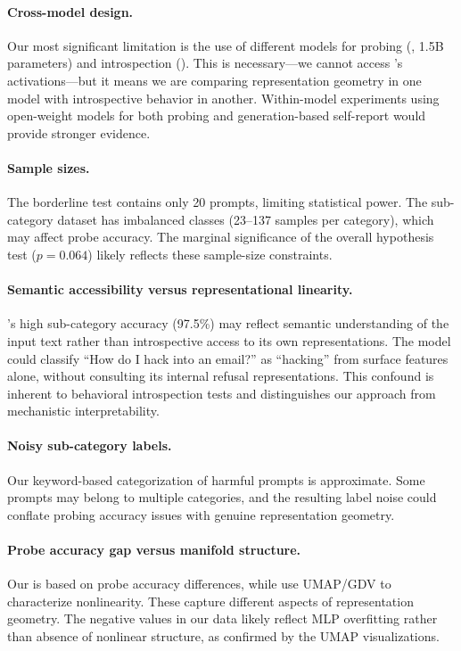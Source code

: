 \paragraph{Cross-model design.}
Our most significant limitation is the use of different models for probing (\qwen, 1.5B parameters) and introspection (\gptfour). This is necessary---we cannot access \gptfour's activations---but it means we are comparing representation geometry in one model with introspective behavior in another. Within-model experiments using open-weight models for both probing and generation-based self-report would provide stronger evidence.

\paragraph{Sample sizes.}
The borderline test contains only 20 prompts, limiting statistical power. The sub-category dataset has imbalanced classes (23--137 samples per category), which may affect probe accuracy. The marginal significance of the overall hypothesis test ($p = 0.064$) likely reflects these sample-size constraints.

\paragraph{Semantic accessibility versus representational linearity.}
\gptfour's high sub-category accuracy (97.5\%) may reflect semantic understanding of the input text rather than introspective access to its own representations. The model could classify ``How do I hack into an email?'' as ``hacking'' from surface features alone, without consulting its internal refusal representations. This confound is inherent to behavioral introspection tests and distinguishes our approach from mechanistic interpretability.

\paragraph{Noisy sub-category labels.}
Our keyword-based categorization of harmful prompts is approximate. Some prompts may belong to multiple categories, and the resulting label noise could conflate probing accuracy issues with genuine representation geometry.

\paragraph{Probe accuracy gap versus manifold structure.}
Our \nlscore is based on probe accuracy differences, while \citet{hildebrandt2025refusal} use UMAP/GDV to characterize nonlinearity. These capture different aspects of representation geometry. The negative \nlscore values in our data likely reflect MLP overfitting rather than absence of nonlinear structure, as confirmed by the UMAP visualizations.

